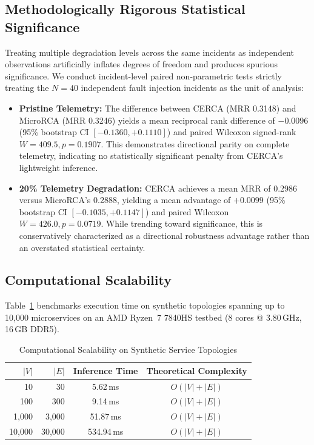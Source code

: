 \documentclass[conference]{IEEEtran}
\begin{document}
\subsection{Methodologically Rigorous Statistical Significance}
Treating multiple degradation levels across the same incidents as independent observations artificially inflates degrees of freedom and produces spurious significance. We conduct incident-level paired non-parametric tests strictly treating the $N = 40$ independent fault injection incidents as the unit of analysis:
\begin{itemize}
    \item \textbf{Pristine Telemetry:} The difference between CERCA (MRR 0.3148) and MicroRCA (MRR 0.3246) yields a mean reciprocal rank difference of $-0.0096$ (95\% bootstrap CI $[-0.1360, +0.1110]$) and paired Wilcoxon signed-rank $W = 409.5, p = 0.1907$. This demonstrates directional parity on complete telemetry, indicating no statistically significant penalty from CERCA's lightweight inference.
    \item \textbf{20\% Telemetry Degradation:} CERCA achieves a mean MRR of 0.2986 versus MicroRCA's 0.2888, yielding a mean advantage of $+0.0099$ (95\% bootstrap CI $[-0.1035, +0.1147]$) and paired Wilcoxon $W = 426.0, p = 0.0719$. While trending toward significance, this is conservatively characterized as a directional robustness advantage rather than an overstated statistical certainty.
\end{itemize}

\subsection{Computational Scalability}
Table~\ref{tab:scalability} benchmarks execution time on synthetic topologies spanning up to 10{,}000 microservices on an AMD Ryzen~7 7840HS testbed (8 cores @ 3.80\,GHz, 16\,GB DDR5).

\begin{table}[!t]
\renewcommand{\arraystretch}{1.15}
\caption{Computational Scalability on Synthetic Service Topologies}
\label{tab:scalability}
\centering
\footnotesize
\setlength{\tabcolsep}{8pt}
\begin{tabular}{rrcc}
\toprule
$|V|$ & $|E|$ & Inference Time & Theoretical Complexity \\
\midrule
10 & 30 & 5.62\,ms & $O(|V| + |E|)$ \\
100 & 300 & 9.14\,ms & $O(|V| + |E|)$ \\
1{,}000 & 3{,}000 & 51.87\,ms & $O(|V| + |E|)$ \\
10{,}000 & 30{,}000 & 534.94\,ms & $O(|V| + |E|)$ \\
\bottomrule
\end{tabular}
\end{table}
\end{document}
